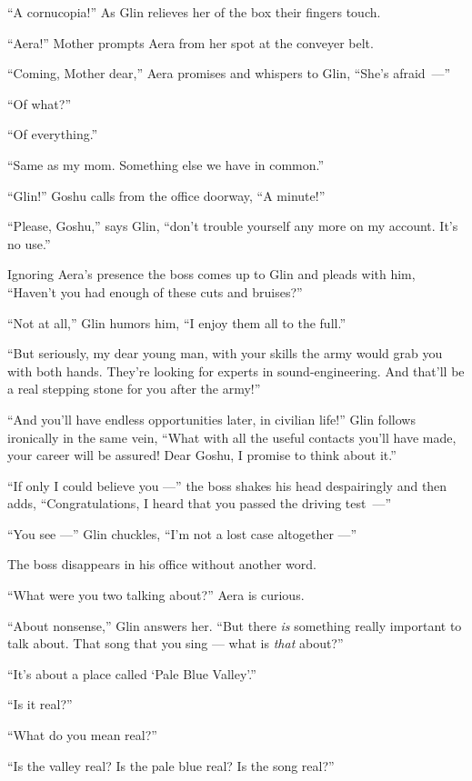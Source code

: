 \documentclass[twoside,11pt,openany]{book}
\begin{document}
``A cornucopia!'' As Glin relieves her of the box their fingers touch.

``Aera!'' Mother prompts Aera from her spot at the conveyer belt.

``Coming, Mother dear,'' Aera promises and whispers to Glin, ``She's \hbox{afraid ---''}

``Of what?''

``Of everything.''

``Same as my mom. Something else we have in common.''

``Glin!'' Goshu calls from the office doorway, ``A minute!''

``Please, Goshu,'' says Glin, ``don't trouble yourself any more on my account.
It's no use.''

Ignoring Aera's presence the boss comes up to Glin and pleads with him, ``Haven't you had enough of these
cuts and bruises?''

``Not at all,'' Glin humors him, ``I enjoy them all to the full.''

``But seriously, my dear young man, with your skills the army would grab you with both hands. They're
looking for experts in sound-enginee\-ring.
And that'll be a real stepping stone for you after the army!''

``And you'll have endless opportunities later, in civilian life!''  Glin follows
ironically{ }in the same vein, ``What with all the useful contacts you'll have made, your
career will be assured!  Dear Goshu, I promise to think about it.''

``If only I could believe you ---'' the boss shakes his head despairingly and
then adds, ``Congratulations, I heard that you passed the driving test~---''

``You see ---'' Glin chuckles, ``I'm not a lost case altogether ---''

The boss disappears in his office without another word.

{ }``What were you two talking about?'' Aera is curious.

``About nonsense,'' Glin answers her. ``But there \textit{is} something really
important to talk about. That song that you sing --- what is \textit{that} about?''

``It's about a place called `Pale Blue Valley'.''

``Is it real?''

``What do you mean real?''

``Is the valley real? Is the pale blue real? Is the song real?''
\end{document}

